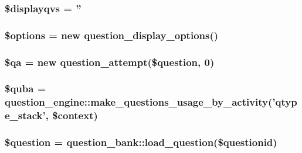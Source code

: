 \label{questiontestrun_8php_a2a1b481ca3e5ae5c2d7a66d271302f23}
\hypertarget{questiontestrun_8php_a186e58741cf4a169829b703a5abd2ab4}{
\subsubsection[{\$displayqvs}]{\setlength{\rightskip}{0pt plus 5cm}\$displayqvs = ''}}
\label{questiontestrun_8php_a186e58741cf4a169829b703a5abd2ab4}
\hypertarget{questiontestrun_8php_a011800c63ece4cbbfa77136a20607023}{
\subsubsection[{\$options}]{\setlength{\rightskip}{0pt plus 5cm}\$options = new question\_\-display\_\-options()}}
\label{questiontestrun_8php_a011800c63ece4cbbfa77136a20607023}
\hypertarget{questiontestrun_8php_a6eb71c1db10cf807d2a126758ad4a3db}{
\subsubsection[{\$qa}]{\setlength{\rightskip}{0pt plus 5cm}\$qa = new question\_\-attempt(\$question, 0)}}
\label{questiontestrun_8php_a6eb71c1db10cf807d2a126758ad4a3db}
\hypertarget{questiontestrun_8php_aaed3376a71ab765cf831ccd5d4540d8e}{
\subsubsection[{\$quba}]{\setlength{\rightskip}{0pt plus 5cm}\$quba = question\_\-engine::make\_\-questions\_\-usage\_\-by\_\-activity('{\bf qtype\_\-stack}', \$context)}}
\label{questiontestrun_8php_aaed3376a71ab765cf831ccd5d4540d8e}
\hypertarget{questiontestrun_8php_acf0d1ba8b3999333306bf1a4fd363e93}{
\subsubsection[{\$question}]{\setlength{\rightskip}{0pt plus 5cm}\$question = question\_\-bank::load\_\-question(\$questionid)}}
